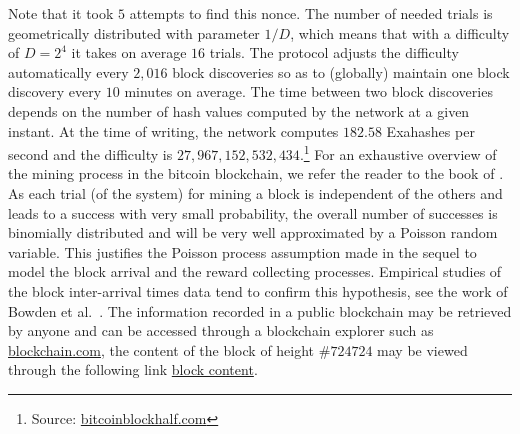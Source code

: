 Note that it took $5$ attempts to find this nonce. The number of needed trials is geometrically distributed with parameter $1 / D$, which means that with a difficulty of $D = 2^4$ it takes on average $16$ trials. The protocol adjusts the difficulty automatically every $2,016$ block discoveries so as to (globally) maintain one block discovery every $10$ minutes on average. The time between two block discoveries depends on the number of hash values computed by the network at a given instant. At the time of writing, the network computes $182.58$ Exahashes per second and the difficulty is $27,967,152,532,434$.\footnote{Source: \href{https://www.bitcoinblockhalf.com/}{bitcoinblockhalf.com}} For an exhaustive overview of the mining process in the bitcoin blockchain, we refer the reader to the book of \citet[Chapter 10]{Antonopoulos2017}. As each trial (of the system) for mining a block is
independent of the others and leads to a success with very small probability, the overall
number of successes is binomially distributed and will be very well approximated by a
Poisson random variable. This justifies the Poisson process assumption made in the sequel to model the block arrival and the reward collecting processes. Empirical studies of the block inter-arrival times data tend to confirm this hypothesis, see the work of Bowden et al.\ \citet{Bowden2020}. The information recorded in a public blockchain may be retrieved by anyone and can be accessed through a blockchain explorer such as \href{https://www.blockchain.com/}{blockchain.com}, the content of the block of height $\#724724$ may be viewed through the following link \href{https://www.blockchain.com/btc/block/0000000000000000000954d42e8ced7017448cb9f39b364e371a1eec6e34463b}{block content}.\\

